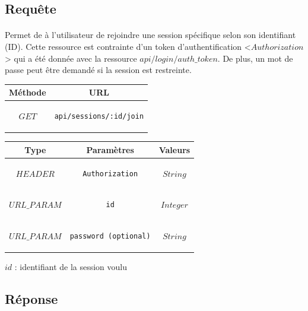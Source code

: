 \documentclass[titlepage, 12pt]{report}
\begin{document}
\subsection{Requête}

\paragraph{} Permet de à l'utilisateur de rejoindre une session spécifique selon son identifiant (ID). Cette ressource est contrainte d'un token d'authentification <$Authorization$> qui a été donnée avec la ressource $api/login/auth\_token$. De plus, un mot de passe peut être demandé si la session est restreinte.

\begin{center}
	\begin{tabular}{|c|c|}
	\hline
	Méthode & URL \\
	\hline
	$ GET $ 
	&
	\begin{lstlisting}
api/sessions/:id/join
	\end{lstlisting} 
	\\ \hline
	\end{tabular}
\end{center}


\begin{center}
	\begin{tabular}{|c|c|c|}
	\hline
	Type & Paramètres & Valeurs \\ \hline
	$ HEADER $ & 
	\begin{lstlisting}
Authorization
	\end{lstlisting} &
	$ String $ \\ \hline
	$ URL\_PARAM $ & 
	\begin{lstlisting}
id
	\end{lstlisting} &
	$ Integer $ \\ \hline
	$ URL\_PARAM $ & 
	\begin{lstlisting}
password (optional)
	\end{lstlisting} &
	$ String $ \\ \hline
	\end{tabular}
\end{center}

\par $ id $ : identifiant de la session voulu
\subsection{Réponse}
\end{document}
